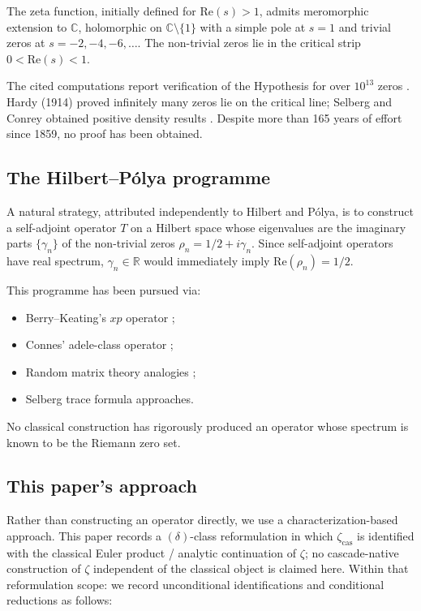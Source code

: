 \documentclass[11pt, a4paper]{amsart}
\theoremstyle{definition}
\newcommand{\R}{\mathbb{R}}
\newcommand{\C}{\mathbb{C}}
\newcommand{\zetacas}{\zeta_{\mathrm{cas}}}
\begin{document}
The zeta function, initially defined for $\mathrm{Re}(s) > 1$,
admits meromorphic extension to $\C$, holomorphic on
$\C \setminus \{1\}$ with a simple pole at $s=1$ and trivial zeros
at $s = -2, -4, -6, \ldots$. The
non-trivial zeros lie in the critical strip $0 < \mathrm{Re}(s) < 1$.

The cited computations report verification of the Hypothesis for over
$10^{13}$ zeros \cite{Gourdon}. Hardy (1914) proved infinitely many zeros lie
on the critical line; Selberg and Conrey obtained positive density
results \cite{Conrey1989}. Despite more than 165 years of effort
since 1859, no proof has been obtained.

\subsection{The Hilbert--Pólya programme}

A natural strategy, attributed independently to Hilbert and Pólya,
is to construct a self-adjoint operator $T$ on a Hilbert space
whose eigenvalues are the imaginary parts $\{\gamma_n\}$ of the
non-trivial zeros $\rho_n = 1/2 + i\gamma_n$. Since self-adjoint
operators have real spectrum, $\gamma_n \in \R$ would immediately
imply $\mathrm{Re}(\rho_n) = 1/2$.

This programme has been pursued via:
\begin{itemize}
\item Berry--Keating's $xp$ operator \cite{BerryKeating1999};
\item Connes' adele-class operator \cite{Connes1999};
\item Random matrix theory analogies \cite{Montgomery1973, KeatingSnaith};
\item Selberg trace formula approaches.
\end{itemize}

No classical construction has rigorously produced an operator whose
spectrum is known to be the Riemann zero set.

\subsection{This paper's approach}

Rather than constructing an operator directly, we use a
characterization-based approach. This paper records a
$(\delta)$-class reformulation in which $\zetacas$ is identified
with the classical Euler product / analytic continuation of
$\zeta$; no cascade-native construction of $\zeta$ independent of
the classical object is claimed here. Within that reformulation
scope: we record unconditional identifications and conditional
reductions as follows:
\end{document}
